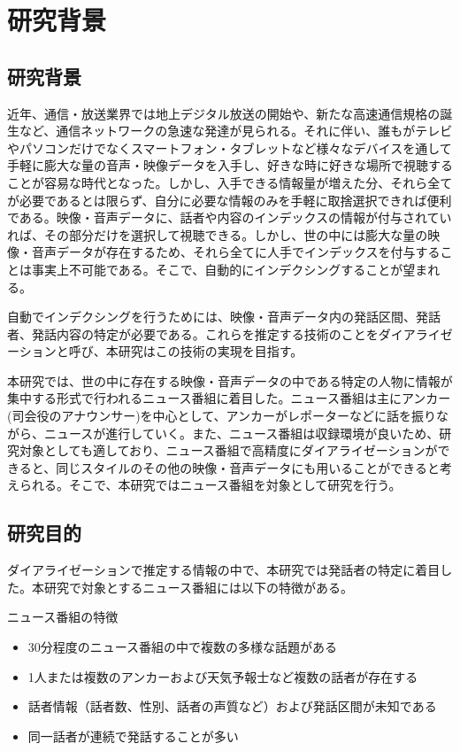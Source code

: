 \chapter{研究背景}

\section{研究背景}
近年、通信・放送業界では地上デジタル放送の開始や、新たな高速通信規格の誕生など、通信ネットワークの急速な発達が見られる。それに伴い、誰もがテレビやパソコンだけでなくスマートフォン・タブレットなど様々なデバイスを通して手軽に膨大な量の音声・映像データを入手し、好きな時に好きな場所で視聴することが容易な時代となった。しかし、入手できる情報量が増えた分、それら全てが必要であるとは限らず、自分に必要な情報のみを手軽に取捨選択できれば便利である。映像・音声データに、話者や内容のインデックスの情報が付与されていれば、その部分だけを選択して視聴できる。しかし、世の中には膨大な量の映像・音声データが存在するため、それら全てに人手でインデックスを付与することは事実上不可能である。そこで、自動的にインデクシングすることが望まれる。\par
自動でインデクシングを行うためには、映像・音声データ内の発話区間、発話者、発話内容の特定が必要である。これらを推定する技術のことをダイアライゼーションと呼び、本研究はこの技術の実現を目指す。\par
本研究では、世の中に存在する映像・音声データの中である特定の人物に情報が集中する形式で行われるニュース番組に着目した。ニュース番組は主にアンカー(司会役のアナウンサー)を中心として、アンカーがレポーターなどに話を振りながら、ニュースが進行していく。また、ニュース番組は収録環境が良いため、研究対象としても適しており、ニュース番組で高精度にダイアライゼーションができると、同じスタイルのその他の映像・音声データにも用いることができると考えられる。そこで、本研究ではニュース番組を対象として研究を行う。

\section{研究目的}
ダイアライゼーションで推定する情報の中で、本研究では発話者の特定に着目した。本研究で対象とするニュース番組には以下の特徴がある。\newline

ニュース番組の特徴
\begin{itemize}
\item 30分程度のニュース番組の中で複数の多様な話題がある
\item 1人または複数のアンカーおよび天気予報士など複数の話者が存在する
\item 話者情報（話者数、性別、話者の声質など）および発話区間が未知である
\item 同一話者が連続で発話することが多い
\end{itemize}\par\par

